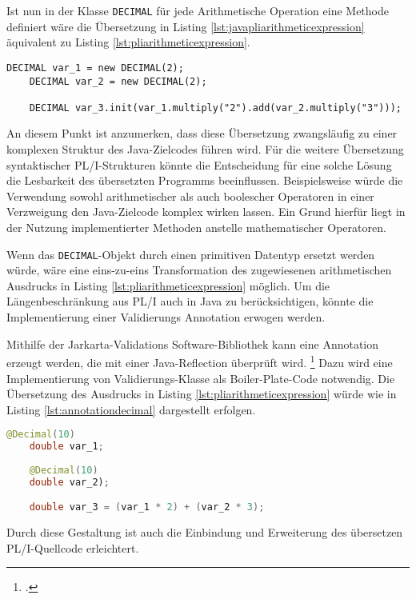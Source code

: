 Ist nun in der Klasse \verb+DECIMAL+ für jede Arithmetische Operation eine Methode definiert wäre die Übersetzung in Listing \ref{lst:javapliarithmeticexpression} äquivalent zu Listing \ref{lst:pliarithmeticexpression}.

\begin{lstlisting}[language=PL/I, caption=Arithmetischer Ausdruck aus PL/I in Java, label={lst:javapliarithmeticexpression}]
	DECIMAL var_1 = new DECIMAL(2);
	DECIMAL var_2 = new DECIMAL(2);
	
	DECIMAL var_3.init(var_1.multiply("2").add(var_2.multiply("3")));
\end{lstlisting}

An diesem Punkt ist anzumerken, dass diese Übersetzung zwangsläufig zu einer komplexen Struktur des Java-Zielcodes führen wird. Für die weitere Übersetzung syntaktischer PL/I-Strukturen könnte die Entscheidung für eine solche Lösung die Lesbarkeit des übersetzten Programms beeinflussen. Beispielsweise würde die Verwendung sowohl arithmetischer als auch boolescher Operatoren in einer Verzweigung den Java-Zielcode komplex wirken lassen. Ein Grund hierfür liegt in der Nutzung implementierter Methoden anstelle mathematischer Operatoren.

Wenn das \verb+DECIMAL+-Objekt durch einen primitiven Datentyp ersetzt werden würde, wäre eine eins-zu-eins Transformation des zugewiesenen arithmetischen Ausdrucks in Listing \ref{lst:pliarithmeticexpression} möglich. Um die Längenbeschränkung aus PL/I auch in Java zu berücksichtigen, könnte die Implementierung einer Validierungs Annotation erwogen werden.

Mithilfe der Jarkarta-Validations Software-Bibliothek kann eine Annotation erzeugt werden, die mit einer Java-Reflection überprüft wird. \footcite[Vgl. ][]{jakarta}
Dazu wird eine Implementierung von Validierungs-Klasse als Boiler-Plate-Code  notwendig. 
Die Übersetzung des Ausdrucks in Listing \ref{lst:pliarithmeticexpression} würde wie in Listing \ref{lst:annotationdecimal} dargestellt erfolgen.

\begin{lstlisting}[language=Java, caption=Annotations Lösung des DECIMAL-Typs, label={lst:annotationdecimal}]
	@Decimal(10)
	double var_1;
	
	@Decimal(10)
	double var_2);

	double var_3 = (var_1 * 2) + (var_2 * 3);
\end{lstlisting}

Durch diese Gestaltung ist auch die Einbindung und Erweiterung des übersetzen PL/I-Quellcode erleichtert.

